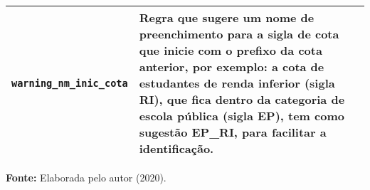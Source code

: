 \begin{table}[ht]
\begin{tabular}{|p{6cm}|p{8cm}|}
\texttt{warning\_nm\_inic\_cota}          & Regra que sugere um nome de preenchimento para a sigla de cota que inicie com o prefixo da cota anterior, por exemplo: a cota de estudantes de renda inferior (sigla RI), que fica dentro da categoria de escola pública (sigla EP), tem como sugestão EP\_RI, para facilitar a identificação.
\\ \hline

\end{tabular}

  \par\medskip\textbf{Fonte:} Elaborada pelo autor (2020). \par\medskip
\end{table}

